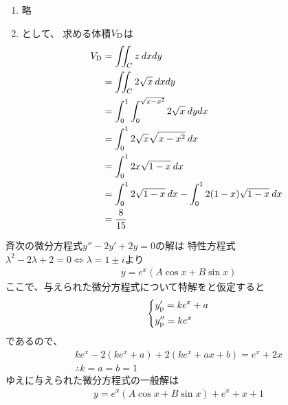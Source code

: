 \begin{ans*} %
  \begin{enumerate}[label=(\arabic*)]
    \item 略
    \item {}として、
    求める体積$V_{\rm{D}}$は
    \begin{align}
      V_{\rm{D}}
      &= \iint_C z\:dxdy \\
      &= \iint_C 2\sqrt{x}\:dxdy \\
      &= \int_{0}^{1}\int_{0}^{\sqrt{x-x^2}} 2\sqrt{x}\:dydx \\
      &= \int_{0}^{1}2\sqrt{x}\sqrt{x-x^2}\:dx \\
      &= \int_{0}^{1} 2x\sqrt{1-x}\:dx \\
      &= \int_{0}^{1} 2\sqrt{1-x}\:dx - \int_{0}^{1}2(1-x)\sqrt{1-x}\:dx \\
      &= \frac{8}{15}
    \end{align}
  \end{enumerate}
  
\end{ans*}

\begin{ans*}
  斉次の微分方程式$y'' - 2y' + 2y = 0$の解は
  特性方程式$\lambda^2 - 2\lambda + 2 = 0\Longleftrightarrow \lambda = 1\pm i$より
  \begin{gather}
    y = e^x (A\cos x + B\sin x)
  \end{gather}
  ここで、与えられた微分方程式について特解をと仮定すると
  \begin{gather}
    \begin{dcases*}
      y'_{\rm{p}} = ke^x + a \\
      y''_{\rm{p}} = ke^x
    \end{dcases*}
  \end{gather}
  であるので、
  \begin{gather}
    ke^x - 2(ke^x + a) + 2(ke^x + ax + b) = e^x + 2x \\
    \therefore k = a = b = 1
  \end{gather}
  ゆえに与えられた微分方程式の一般解は
  \begin{gather}
    y = e^x(A\cos x + B\sin x) + e^x + x + 1
  \end{gather}
\end{ans*}


